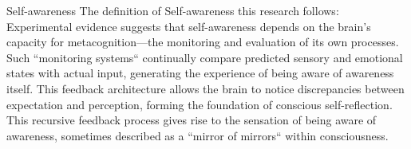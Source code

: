 \begin{frame}{Self-awareness}
    The definition of Self-awareness this research follows:\\
    Experimental evidence suggests that self-awareness depends on the brain's capacity for metacognition—the monitoring and evaluation of its own processes. Such ``monitoring systems`` continually compare predicted sensory and emotional states with actual input, generating the experience of being aware of awareness itself. This feedback architecture allows the brain to notice discrepancies between expectation and perception, forming the foundation of conscious self-reflection. This recursive feedback process gives rise to the sensation of being aware of awareness, sometimes described as a ``mirror of mirrors`` within consciousness.\cite{garcia-2013-stuck-in-the-moment}
\end{frame}